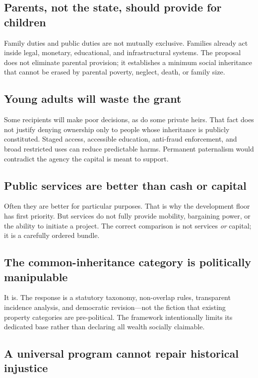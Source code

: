 \documentclass[11pt]{article}
\begin{document}
\subsection{Parents, not the state, should provide for children}

Family duties and public duties are not mutually exclusive. Families already act inside
legal, monetary, educational, and infrastructural systems. The proposal does not
eliminate parental provision; it establishes a minimum social inheritance that cannot
be erased by parental poverty, neglect, death, or family size.

\subsection{Young adults will waste the grant}

Some recipients will make poor decisions, as do some private heirs. That fact does not
justify denying ownership only to people whose inheritance is publicly constituted.
Staged access, accessible education, anti-fraud enforcement, and broad restricted uses
can reduce predictable harms. Permanent paternalism would contradict the agency the
capital is meant to support.

\subsection{Public services are better than cash or capital}

Often they are better for particular purposes. That is why the development floor has
first priority. But services do not fully provide mobility, bargaining power, or the
ability to initiate a project. The correct comparison is not services \emph{or} capital;
it is a carefully ordered bundle.

\subsection{The common-inheritance category is politically manipulable}

It is. The response is a statutory taxonomy, non-overlap rules, transparent incidence
analysis, and democratic revision---not the fiction that existing property categories
are pre-political. The framework intentionally limits its dedicated base rather than
declaring all wealth socially claimable.

\subsection{A universal program cannot repair historical injustice}
\end{document}
